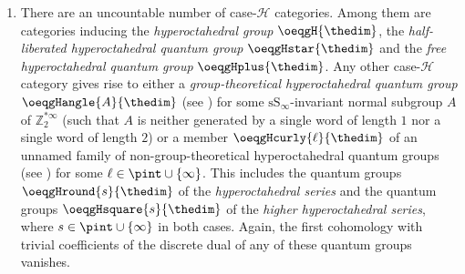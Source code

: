 \documentclass[pdftex]{sigma}
\numberwithin{equation}{section}
\begin{document}
\begin{Remark}
\begin{enumerate}
          \item There are an uncountable number of case-$\mathcal{H}$ categories. Among them are  categories inducing the \emph{hyperoctahedral group} $\oeqgH{\thedim}$, the \emph{half-liberated hyperoctahedral quantum group} $\oeqgHstar{\thedim}$ and the \emph{free hyperoctahedral quantum group} $\oeqgHplus{\thedim}$. Any other case-$\mathcal{H}$ category gives rise to either a \emph{group-theoretical hyperoctahedral quantum group} $\oeqgHangle{A}{\thedim}$ (see \cite{RaumWeber2014,RaumWeber2016a}) for some $\mathrm{sS}_\infty$-invariant normal subgroup $A$  of $\mathbb{Z}_2^{\ast\infty}$ (such that $A$ is neither generated by a single word of length $1$ nor a single word of length $2$) or a member $\oeqgHcurly{\ell}{\thedim}$ of an unnamed family of non-group-theoretical hyperoctahedral quantum groups (see \cite{RaumWeber2016b}) for some $\ell\in \pint\cup\{\infty\}$. This includes the quantum groups $\oeqgHround{s}{\thedim}$ of the \emph{hyperoctahedral series} and the quantum groups $\oeqgHsquare{s}{\thedim}$ of the \emph{higher hyperoctahedral series}, where $s\in \pint\cup\{\infty\}$ in both cases. Again, the first cohomology with trivial coefficients of the discrete dual of any of these quantum groups vanishes.
      \end{enumerate}
    \end{Remark}
\end{document}
